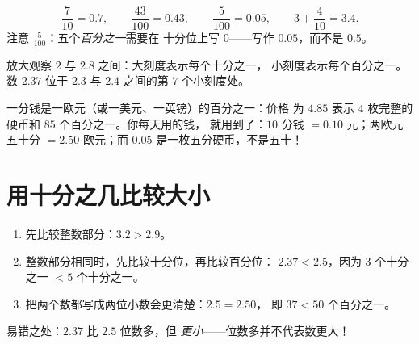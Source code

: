 \begin{example}\label{ex:g4:decimals:convert}
\[
\frac{7}{10} = 0.7, \qquad
\frac{43}{100} = 0.43, \qquad
\frac{5}{100} = 0.05, \qquad
3 + \frac{4}{10} = 3.4 .
\]
注意 $\frac{5}{100}$：五个\emph{百分之一}需要在
十分位上写 $0$——写作 $0.05$，而不是 $0.5$。
\end{example}

\begin{omfigure}

{\small 放大观察 $2$ 与 $2.8$ 之间：大刻度表示每个十分之一，
小刻度表示每个百分之一。数 $2.37$ 位于 $2.3$ 与
$2.4$ 之间的第 $7$ 个小刻度处。}
\end{omfigure}

\begin{example}[钱与百分之一]\label{ex:g4:decimals:money}
一分钱是一欧元（或一美元、一英镑）的百分之一：价格
为 $4.85$ 表示 $4$ 枚完整的硬币和 $85$ 个百分之一。你每天用的钱，
就用到了：$10$ 分钱 $= 0.10$ 元；两欧元五十分
$= 2.50$ 欧元；而 $0.05$ 是一枚五分硬币，不是五十！
\end{example}

\section{用十分之几比较大小}

\begin{method}\label{met:g4:decimals:compare}
\begin{enumerate}
  \item 先比较整数部分：$3.2 > 2.9$。
  \item 整数部分相同时，先比较十分位，再比较百分位：
        $2.37 < 2.5$，因为 $3$ 个十分之一 $< 5$ 个十分之一。
  \item 把两个数都写成两位小数会更清楚：$2.5 = 2.50$，
        即 $37 < 50$ 个百分之一。
\end{enumerate}
易错之处：$2.37$ 比 $2.5$ 位数多，但
\emph{更小}——位数多并不代表数更大！
\end{method}

